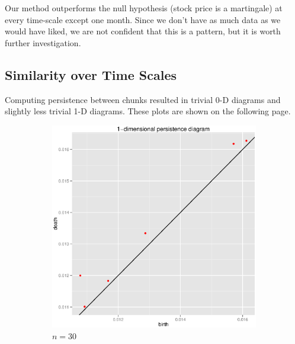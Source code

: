 \documentclass{article}
\begin{document}
Our method outperforms the null hypothesis (stock price is a martingale) at every time-scale except one month. Since we don’t have as much data as we would have liked, we are not confident that this is a pattern, but it is worth further investigation.

\subsection{Similarity over Time Scales}
Computing persistence between chunks resulted in trivial 0-D diagrams and slightly less trivial 1-D diagrams. These plots are shown on the following page.

\newpage

\begin{figure}
\centering
\begin{subfigure}[htbp]{0.49 \textwidth}
\includegraphics[width = \linewidth]{psqplots/p2-1-90}
\caption{$n = 30$}
\label{p2-1-30}
\end{subfigure}
~
\begin{subfigure}[htbp]{0.49 \textwidth}

\end{subfigure}
\end{figure}
\end{document}
